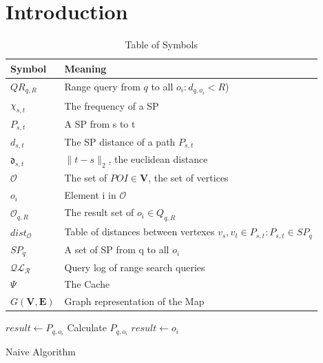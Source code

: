 \section{Introduction} \label{sec:intro}


\begin{table}
\begin{tabular*}{\columnwidth}{|l|p{}|}
\hline
\bf Symbol		& \bf Meaning \\\hline
$QR_{q,R}$		& Range query from $q$ to all $o_i : d_{q,o_i} < R$) \\\hline
$\chi_{s,t}$		& The frequency of a SP\\\hline
$P_{s,t}$		& A SP from s to t \\\hline
$d_{s,t}$		& The SP distance of a path $P_{s,t}$ \\\hline
$\mathfrak{d}_{s,t}$	& $\| t - s \|_2$, the euclidean distance \\\hline
$\mathcal{O}$		& The set of $POI \in \mathbf{V}$, the set of vertices\\\hline
$o_i$			& Element i in $\mathcal{O}$ \\\hline
$\mathcal{O}_{q,R}$	& The result set of  $o_i \in Q_{q,R}$ \\\hline
$dist_{\mathcal{O}}$	& Table of distances between vertexes $v_s, v_t \in P_{s,t} :  P_{s,t} \in SP_q$ \\\hline
$SP_{q}$		& A set of SP from q to all $o_i$ \\\hline
$\mathcal{QL_R}$	& Query log of range search queries \\\hline
$\Psi$ 			& The Cache \\\hline
$G\mathbf{(V,E)}$ 	& Graph representation of the Map \\\hline 

\end{tabular*}
\caption{Table of Symbols}
\label{tab:symbols}
\end{table}

\begin{algorithm}[bht]
\dontprintsemicolon
\SetVline




{
    {
      { 
	  $result \leftarrow P_{q,o_i}$ \;
      }
      \Else
      {
	  Calculate $P_{q,o_i}$  \;
	    { $result \leftarrow o_i$ \; }
      }
    }
     \;
}

\caption{Naive Algorithm}
\label{alg:naive}
\end{algorithm}


